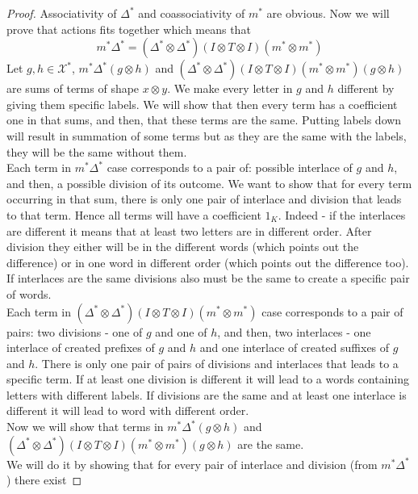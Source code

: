 \documentclass[a4paper, 12pt]{report}
\begin{document}
\begin{proof}
Associativity of $\Delta^*$ and coassociativity of $m^*$ are obvious.
Now we will prove that actions fits together which means that
\begin{equation*}
m^*\Delta^* = (\Delta^*\otimes \Delta^*)(I \otimes T \otimes I)(m^* \otimes m^*)
\end{equation*}
Let $g, h \in \mathcal{X}^*$, $m^*\Delta^*(g \otimes h)$ and $(\Delta^*\otimes \Delta^*)(I \otimes T \otimes
I)(m^* \otimes m^*)(g \otimes h)$ are sums of terms of shape $x \otimes y$. We make every letter in
$g$ and $h$ different by giving them specific labels. We will show that then every term has
a coefficient one in that sums, and then, that these terms are the same. Putting labels down will result in
summation of some terms but as they are the same with the labels, they will be the same without them.\\
\indent Each term in $m^*\Delta^*$ case corresponds to a pair of: possible interlace of $g$ and $h$, and
then, a possible division of its outcome. We want to show that for every term occurring in that sum, there
is only one pair of interlace and division that leads to that term. Hence all terms will have a coefficient
$1_K$. Indeed - if the interlaces are different it means that at least two letters are in different order.
After division they either will be in the different words (which points out the difference) or in one word in
different order (which points out the difference too). If interlaces are the same divisions also must be
the same
to create a specific pair of words. \\
\indent Each term in $(\Delta^*\otimes \Delta^*)(I \otimes T \otimes I)(m^* \otimes m^*)$ case corresponds to
a pair of pairs: two divisions - one of $g$ and one of $h$, and then, two interlaces - one interlace of
created prefixes of $g$ and $h$ and one interlace of created suffixes of $g$ and $h$.
There is only one pair of pairs of divisions and interlaces that leads to a specific term. If at least one
division is different it will lead to a words containing letters with different labels. If divisions are
the same and at least one interlace is different it will lead to word with different order. \\
\indent Now we will show that terms in $m^*\Delta^*(g \otimes h)$ and $(\Delta^*\otimes \Delta^*)(I \otimes T
\otimes I)(m^* \otimes m^*)(g \otimes h)$ are the same. \\
We will do it by showing that for every pair of interlace and division (from $m^*\Delta^*$) there exist

\end{proof}
\end{document}
